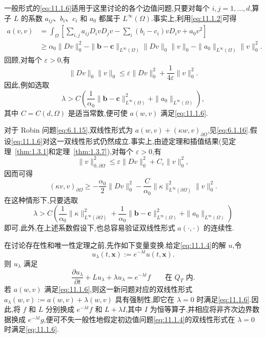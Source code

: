 一般形式的\eqref{eq:11.1.6}适用于这里讨论的各个边值问题,只要对每个 \(i,j=1,\ldots,d\),算子 \(L\) 的系数 \(a_{ij}\)、\(b_i\)、\(c_i\) 和 \(a_0\) 都属于 \(L^\infty(\Omega)\).事实上,利用\eqref{eq:11.1.2}可得
\[
  \begin{aligned}
    a(v,v)&=\int_\Omega\left[\sum_{i,j}a_{ij}D_ivD_jv
                       -\sum_i(b_i-c_i)vD_iv+a_0v^2\right]\\
     &\ge\alpha_0\|Dv\|_0^2
        -\|\boldsymbol{b}-\boldsymbol{c}\|_{L^\infty(\Omega)}\|Dv\|_0\|v\|_0
        -\|a_0\|_{L^\infty(\Omega)}\|v\|_0^2.
  \end{aligned}
\]
回顾,对每个 \(\varepsilon>0\),有
\[
  \|Dv\|_0\|v\|_0\le\varepsilon\|Dv\|_0^2+\frac1{4\varepsilon}\|v\|_0^2.
\]
因此,例如选取
\[
  \lambda>C\left(\frac1{\alpha_0}\|\boldsymbol{b}-\boldsymbol{c}\|_{L^\infty(\Omega)}^2
                      +\|a_0\|_{L^\infty(\Omega)}\right),
\]
其中 \(C=C(d,\Omega)\) 是适当常数,便可使 \(a(w,v)\) 满足\eqref{eq:11.1.6}.

对于 Robin 问题\eqref{eq:6.1.15},双线性形式为 \(a(w,v)+(\kappa w,v)_{\partial\Omega}\),见\eqref{eq:6.1.16}.假设\eqref{eq:11.1.6}对这一双线性形式仍然成立.事实上,由迹定理和插值结果(见定理~\ref{thm:1.3.1}和定理~\ref{thm:1.3.7}),对每个 \(\varepsilon>0\),有
\[
  \|v\|_{0,\partial\Omega}^2\le\varepsilon\|Dv\|_0^2+C_\varepsilon\|v\|_0^2,
\]
因而可得
\[
  (\kappa v,v)_{\partial\Omega}
    \ge-\frac{\alpha_0}2\|Dv\|_0^2
      -\frac C{\alpha_0}\|\kappa\|_{L^\infty(\partial\Omega)}^2\|v\|_0^2.
\]
在这种情形下,只要选取
\[
  \lambda>C\left(\frac1{\alpha_0}\|\kappa\|_{L^\infty(\partial\Omega)}^2
       +\frac1{\alpha_0}\|\boldsymbol{b}-\boldsymbol{c}\|_{L^\infty(\Omega)}^2
       +\|a_0\|_{L^\infty(\Omega)}\right)
\]
即可.此外,在上述系数假设下,也总容易验证双线性形式 \(a(\cdot,\cdot)\) 的连续性.

在讨论存在性和唯一性定理之前,先作如下变量变换.给定\eqref{eq:11.1.4}的解 \(u\),令
\[
  u_\lambda(t,\boldsymbol{x}):=e^{-\lambda t}u(t,\boldsymbol{x}).
\]
则 \(u_\lambda\) 满足
\[
  \frac{\partial u_\lambda}{\partial t}+Lu_\lambda+\lambda u_\lambda
    =e^{-\lambda t}f\qquad\text{在 }Q_T\text{ 内}.
\]
若 \(a(w,v)\) 满足\eqref{eq:11.1.6},则这一新问题对应的双线性形式 \(a_\lambda(w,v):=a(w,v)+\lambda(w,v)\) 具有强制性,即它在 \(\lambda=0\) 时满足\eqref{eq:11.1.6}.因此,将 \(f\) 和 \(L\) 分别换成 \(e^{-\lambda t}f\) 和 \(L+\lambda I\),其中 \(I\) 为恒等算子,并相应将非齐次边界数据换成 \(e^{-\lambda t}g\),便可不失一般性地假定初边值问题\eqref{eq:11.1.4}的双线性形式在 \(\lambda=0\) 时满足\eqref{eq:11.1.6}.

